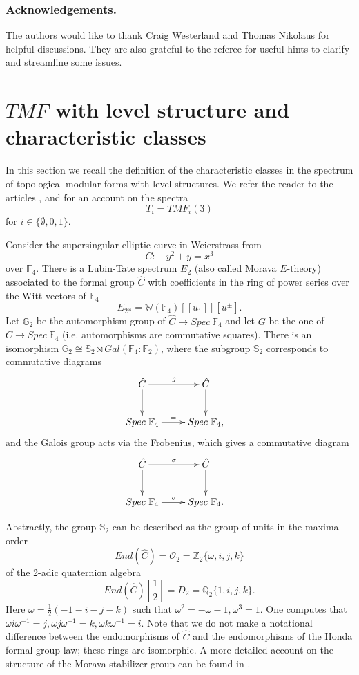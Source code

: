 \documentclass{amsart}
\renewcommand{\S}{{\mathbb S}}
\renewcommand{\O}{{\cal O}}
\renewcommand{\O}{{\mathcal O}}
\newcommand {\F}{{\mathbb F}}
\newcommand {\Z}{{\mathbb Z}}
\newcommand {\Q}{{\mathbb Q}}
\newcommand {\W}{{\mathbb W}}
\newcommand {\G}{{\mathbb G}}
\numberwithin{equation}{section}
\theoremstyle{definition}  %
\newtheorem{set theory}[thm]{Set Theoretic Prelude}
\begin{document}
\subsubsection*{Acknowledgements.} The authors would like to thank Craig Westerland  and Thomas Nikolaus for helpful discussions. They are also grateful to the referee for useful hints to clarify and streamline some issues.

\section{$TMF$ with level structure and characteristic classes}
In this section we recall the definition of the characteristic classes in the spectrum of topological modular forms with level structures. We refer the reader to the articles \cite{MR2508904}, \cite{MR3471093}  and \cite{MR3448393} for an account on the spectra 
$$T_i=TMF_i(3)$$
for  $i\in \{ \emptyset, 0,1\}$. \par
Consider the supersingular elliptic curve in Weierstrass from
$$C: \quad y^2 +y=x^3$$  
over $\F_4$. There is a Lubin-Tate spectrum $E_2$ (also called Morava $E$-theory) associated to the formal group $\hat{C}$ with coefficients in the ring of power series over the Witt vectors of $\F_4$
$$E_2{}_*=\W(\F_4)[\! [u_1]\!][u^\pm].$$
Let $\G_2$  be the automorphism group of $\hat{C} \to Spec\  \F_4$ and let $G$ be the one of $C\to Spec\  \F_4$ (i.e. automorphisms are commutative squares). 
There is an isomorphism $\G_2 \cong \S_2 \rtimes Gal(\F_4:\F_2)$, where the subgroup $\S_2$  corresponds to commutative diagrams
\begin{eqnarray*}\label{}
&\xymatrix{
\hat{C} \ar[d]\ar[r]^-g
&
\hat{C}\ar[d]
\\
Spec\ \F_4
\ar[r]^-=
&
Spec\ \F_4,
}
\end{eqnarray*} 
and the Galois group acts via the Frobenius, which gives a commutative diagram
\begin{eqnarray*}\label{}
&\xymatrix{
\hat{C} \ar[d]\ar[r]^-\sigma
&
\hat{C}\ar[d]
\\
Spec\  \F_4
\ar[r]^\sigma
&
Spec\  \F_4.
}
\end{eqnarray*} 
\bigskip

Abstractly,  the group $\S_2$ can be described as the group of units in the maximal order $$End(\hat{C})=\O_2=\Z_2\{\omega,i,j,k\}$$ of the 2-adic quaternion algebra $$End(\hat{C})\left[\frac12\right]=D_2=\Q_2\{1,i,j,k\}.$$
Here $\omega=\frac12(-1-i-j-k)$ such that $\omega^2=-\omega -1,\omega^3=1$.
One computes that $\omega i \omega^{-1}=j, \omega j \omega^{-1}=k, \omega k \omega^{-1}=i$.
Note that we do not make a notational difference between the endomorphisms of $\hat{C}$ and the endomorphisms of the Honda formal group law; these rings are isomorphic. A more detailed account on the structure of the Morava stabilizer group can be found in \cite{MR3450774}.
\end{document}
